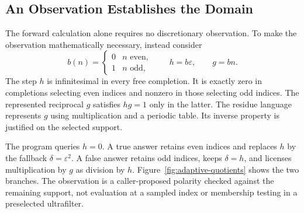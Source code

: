 \documentclass[11pt,a4paper]{article}
\theoremstyle{result}
\theoremstyle{definition}
\begin{document}
\subsection{An Observation Establishes the Domain}

The forward calculation alone requires no discretionary observation. To make the observation mathematically necessary, instead consider
\[
  b(n)=\begin{cases}0&n\text{ even},\\1&n\text{ odd},\end{cases}
  \qquad h=b\varepsilon,\qquad g=bn.
\]
The step $h$ is infinitesimal in every free completion. It is exactly zero in completions selecting even indices and nonzero in those selecting odd indices. The represented reciprocal $g$ satisfies $hg=1$ only in the latter. The residue language represents $g$ using multiplication and a periodic table. Its inverse property is justified on the selected support.

The program queries $h=0$. A true answer retains even indices and replaces $h$ by the fallback $\delta=\varepsilon^2$. A false answer retains odd indices, keeps $\delta=h$, and licenses multiplication by $g$ as division by $h$. Figure~\ref{fig:adaptive-quotients} shows the two branches. The observation is a caller-proposed polarity checked against the remaining support, not evaluation at a sampled index or membership testing in a preselected ultrafilter.
\end{document}
